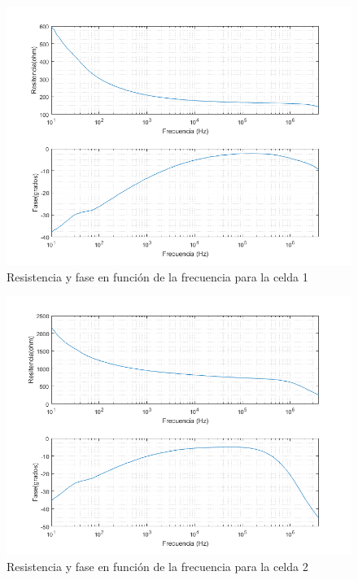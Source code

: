 \begin{figure}[H]
\centering
\includegraphics[width=1\textwidth]{Celda/celda_1.png}
\caption{Resistencia y fase en función de la frecuencia para la celda 1}
\label{fig:celda_1}
\end{figure}

\begin{figure}[H]
\centering
\includegraphics[width=1\textwidth]{Celda/celda_2.png}
\caption{Resistencia y fase en función de la frecuencia para la celda 2}
\label{fig:celda_2}
\end{figure}

